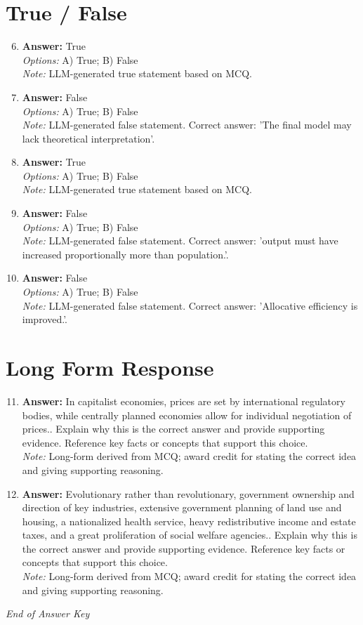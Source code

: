 \documentclass[12pt]{article}
\begin{document}
\section*{True / False}
\begin{enumerate}[label=\arabic*.]
\setcounter{enumi}{5}
\item \textbf{Answer:} True
\\ \textit{Options:} A) True; B) False
\\ \textit{Note:} LLM-generated true statement based on MCQ.
\item \textbf{Answer:} False
\\ \textit{Options:} A) True; B) False
\\ \textit{Note:} LLM-generated false statement. Correct answer: 'The final model may lack theoretical interpretation'.
\item \textbf{Answer:} True
\\ \textit{Options:} A) True; B) False
\\ \textit{Note:} LLM-generated true statement based on MCQ.
\item \textbf{Answer:} False
\\ \textit{Options:} A) True; B) False
\\ \textit{Note:} LLM-generated false statement. Correct answer: 'output must have increased proportionally more than population.'.
\item \textbf{Answer:} False
\\ \textit{Options:} A) True; B) False
\\ \textit{Note:} LLM-generated false statement. Correct answer: 'Allocative efficiency is improved.'.
\end{enumerate}

\section*{Long Form Response}
\begin{enumerate}[label=\arabic*.]
\setcounter{enumi}{10}
\item \textbf{Answer:} In capitalist economies, prices are set by international regulatory bodies, while centrally planned economies allow for individual negotiation of prices.. Explain why this is the correct answer and provide supporting evidence. Reference key facts or concepts that support this choice.
\\ \textit{Note:} Long-form derived from MCQ; award credit for stating the correct idea and giving supporting reasoning.
\item \textbf{Answer:} Evolutionary rather than revolutionary, government ownership and direction of key industries, extensive government planning of land use and housing, a nationalized health service, heavy redistributive income and estate taxes, and a great proliferation of social welfare agencies.. Explain why this is the correct answer and provide supporting evidence. Reference key facts or concepts that support this choice.
\\ \textit{Note:} Long-form derived from MCQ; award credit for stating the correct idea and giving supporting reasoning.
\end{enumerate}

\vfill
\noindent\textit{End of Answer Key}
\end{document}
